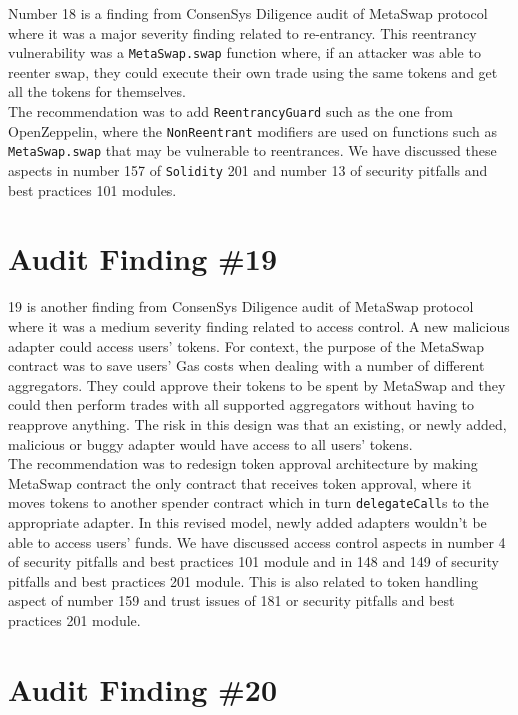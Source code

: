 Number 18 is a finding from ConsenSys Diligence audit of MetaSwap protocol where it was a major severity finding related to re-entrancy. This reentrancy vulnerability was a \verb|MetaSwap.swap| function where, if an attacker was able to reenter swap, they could execute their own trade using the same tokens and get all the tokens for themselves.\\

The recommendation was to add \verb|ReentrancyGuard| such as the one from OpenZeppelin, where the \verb|NonReentrant| modifiers are used on functions such as \verb|MetaSwap.swap| that may be vulnerable to reentrances. We have discussed these aspects in number 157 of \verb|Solidity| 201 and number 13 of security pitfalls and best practices 101 modules.

\section{Audit Finding \#19}

19 is another finding from ConsenSys Diligence audit of MetaSwap protocol where it was a medium severity finding related to access control. A new malicious adapter could access users' tokens. For context, the purpose of the MetaSwap contract was to save users' Gas costs when dealing with a number of different aggregators. They could approve their tokens to be spent by MetaSwap and they could then perform trades with all supported aggregators without having to reapprove anything. The risk in this design was that an existing, or newly added, malicious or buggy adapter would have access to all users' tokens.\\

The recommendation was to redesign token approval architecture by making MetaSwap contract the only contract that receives token approval, where it moves tokens to another spender contract which in turn \verb|delegateCall|s to the appropriate adapter. In this revised model, newly added adapters wouldn't be able to access users' funds. We have discussed access control aspects in number 4 of security pitfalls and best practices 101 module and in 148 and 149 of security pitfalls and best practices 201 module. This is also related to token handling aspect of number 159 and trust issues of 181 or security pitfalls and best practices 201 module.

\section{Audit Finding \#20}

